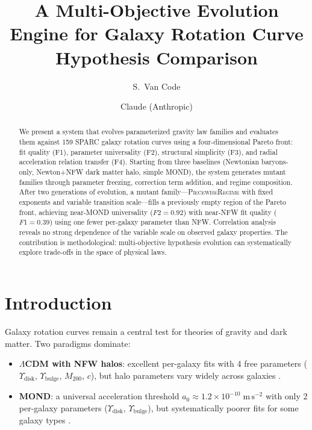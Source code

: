 \documentclass[aps,prl,twocolumn,superscriptaddress,showpacs]{revtex4-2}
\newcommand{\pr}{\textsc{PiecewiseRegime}}
\begin{document}
\title{A Multi-Objective Evolution Engine for Galaxy Rotation Curve Hypothesis Comparison}

\author{S.~Van Code}

\author{Claude (Anthropic)}

\begin{abstract}
We present a system that evolves parameterized gravity law families and evaluates them against 159 SPARC galaxy rotation curves using a four-dimensional Pareto front: fit quality (F1), parameter universality (F2), structural simplicity (F3), and radial acceleration relation transfer (F4). Starting from three baselines (Newtonian baryons-only, Newton+NFW dark matter halo, simple MOND), the system generates mutant families through parameter freezing, correction term addition, and regime composition. After two generations of evolution, a mutant family---\pr{} with fixed exponents and variable transition scale---fills a previously empty region of the Pareto front, achieving near-MOND universality ($F2=0.92$) with near-NFW fit quality ($F1=0.39$) using one fewer per-galaxy parameter than NFW. Correlation analysis reveals no strong dependence of the variable scale on observed galaxy properties. The contribution is methodological: multi-objective hypothesis evolution can systematically explore trade-offs in the space of physical laws.
\end{abstract}


\section{Introduction}\label{sec:intro}

Galaxy rotation curves remain a central test for theories of gravity and dark matter. Two paradigms dominate:

\begin{itemize}
    \item \textbf{$\Lambda$CDM with NFW halos}: excellent per-galaxy fits with 4 free parameters ($\Upsilon_\mathrm{disk}$, $\Upsilon_\mathrm{bulge}$, $M_{200}$, $c$), but halo parameters vary widely across galaxies \citep{NFW1996}.
    \item \textbf{MOND}: a universal acceleration threshold $a_0 \approx 1.2\times10^{-10}\;\mathrm{m\,s^{-2}}$ with only 2 per-galaxy parameters ($\Upsilon_\mathrm{disk}$, $\Upsilon_\mathrm{bulge}$), but systematically poorer fits for some galaxy types \citep{Milgrom1983,Famaey2012}.
\end{itemize}
\end{document}
